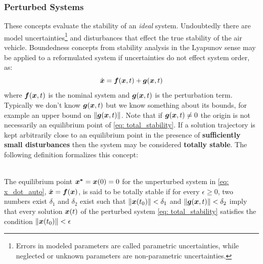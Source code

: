 \documentclass[12pt]{ucthesis}
\begin{document}
\subsubsection{Perturbed Systems}
\label{subsubsec: perturbed_sys}
These concepts evaluate the stability of an \textit{ideal} system. Undoubtedly there are model uncertainties\footnote{Errors in modeled parameters are called parametric uncertainties, while neglected or unknown parameters are non-parametric uncertainties.} and disturbances that effect the true stability of the air vehicle. Boundedness concepts from stability analysis in the Lyapunov sense may be applied to a reformulated system if uncertainties do not effect system order, as:
%
	\begin{equation}
		\dot{\boldsymbol{x}} = \boldsymbol{f}(\boldsymbol{x},t) + \boldsymbol{g}(\boldsymbol{x},t)
		\label{eq: total_stability}
	\end{equation}
%
\noindent where $\boldsymbol{f}(\boldsymbol{x},t)$ is the nominal system and $\boldsymbol{g}(\boldsymbol{x},t)$ is the perturbation term. Typically we don't know $\boldsymbol{g}(\boldsymbol{x},t)$ but we know something about its bounds, for example an upper bound on $\| \boldsymbol{g}(\boldsymbol{x},t) \|$. Note that if $\boldsymbol{g}(\boldsymbol{x},t) \neq 0$ the origin is not necessarily an equilibrium point of \autoref{eq: total_stability}. If a solution trajectory is kept arbitrarily close to an equilibrium point in the presence of \textbf{sufficiently small disturbances} then the system may be considered \textbf{totally stable}. The following definition formalizes this concept:

\begin{defn} \alignright \citet[Defn. 4.13]{Slotine1991} \label{defn: total_stability}\\
	The equilibrium point $\boldsymbol{x^*}=\boldsymbol{x}(0)=0$ for the unperturbed system in \autoref{eq: x_dot_auto}, $\dot{\boldsymbol{x}} = \boldsymbol{f}(\boldsymbol{x})$, is said to be totally stable if for every $\epsilon \geq 0$, two numbers exist $\delta_1$ and $\delta_2$ exist such that $\| \boldsymbol{x}(t_0) \| < \delta_1$ and $\| \boldsymbol{g}(\boldsymbol{x},t) \| < \delta_2$ imply that every solution $\boldsymbol{x}(t)$ of the perturbed system \autoref{eq: total_stability} satisfies the condition $\| \boldsymbol{x}(t_0) \| < \epsilon$
\end{defn}
\end{document}
